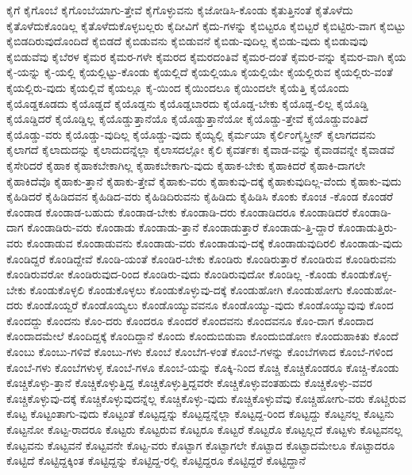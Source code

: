 {ಕೈಗೆ
ಕೈಗೊಂಬೆ
ಕೈಗೊಂಬೆಯಾಗು-ತ್ತೇವೆ
ಕೈಗೊಳ್ಳುವನು
ಕೈಜೋಡಿಸಿ-ಕೊಂಡು
ಕೈತುತ್ತಿನಂತೆ
ಕೈತೊಳೆದು
ಕೈತೊಳೆದುಕೊಂಡಿಲ್ಲ
ಕೈತೊಳೆದುಕೊಳ್ಳಬಲ್ಲರು
ಕೈದೀವಿಗೆ
ಕೈದು-ಗಳನ್ನು
ಕೈಬಿಟ್ಟರೂ
ಕೈಬಿಟ್ಟರೆ
ಕೈಬಿಟ್ಟಿರು-ವಾಗ
ಕೈಬಿಟ್ಟು
ಕೈಬಿಡದಿರುವುದೊಂದಿದೆ
ಕೈಬಿಡದೆ
ಕೈಬಿಡುವನು
ಕೈಬಿಡುವನೆ
ಕೈಬಿಡು-ವುದಿಲ್ಲ
ಕೈಬಿಡು-ವುದು
ಕೈಬಿಡುವುವು
ಕೈಬಿಡುವೆವು
ಕೈಬೆರಳ
ಕೈಮರ
ಕೈಮರ-ಗಳೇ
ಕೈಮರದ
ಕೈಮರದಂತಿವೆ
ಕೈಮರ-ದಂತೆ
ಕೈಮರ-ವನ್ನು
ಕೈಮರ-ವಾಗಿ
ಕೈಯ
ಕೈ-ಯನ್ನು
ಕೈ-ಯಲ್ಲಿ
ಕೈಯಲ್ಲಿಟ್ಟು-ಕೊಂಡು
ಕೈಯಲ್ಲಿದೆ
ಕೈಯಲ್ಲಿಯೂ
ಕೈಯಲ್ಲಿಯೇ
ಕೈಯಲ್ಲಿರುವ
ಕೈಯಲ್ಲಿರು-ವಂತೆ
ಕೈಯಲ್ಲಿರು-ವುದು
ಕೈಯಲ್ಲಿವೆ
ಕೈಯಲ್ಲೂ
ಕೈ-ಯಿಂದ
ಕೈಯಿಂದಲೂ
ಕೈಯಿಂದಲೇ
ಕೈಯೆತ್ತಿ
ಕೈಯೊಂದು
ಕೈಯೊಡ್ಡಕೂಡದು
ಕೈಯೊಡ್ಡದೆ
ಕೈಯೊಡ್ಡನು
ಕೈಯೊಡ್ಡಬಾರದು
ಕೈಯೊಡ್ಡ-ಬೇಕು
ಕೈಯೊಡ್ಡ-ಲಿಲ್ಲ
ಕೈಯೊಡ್ಡಿ
ಕೈಯೊಡ್ಡಿದರೆ
ಕೈಯೊಡ್ಡಿಲ್ಲ
ಕೈಯೊಡ್ಡುತ್ತಾನೆಯೊ
ಕೈಯೊಡ್ಡುತ್ತಾನೆಯೋ
ಕೈಯೊಡ್ಡು-ತ್ತೇವೆ
ಕೈಯೊಡ್ಡುವಂತಿದೆ
ಕೈಯೊಡ್ಡು-ವರು
ಕೈಯೊಡ್ಡು-ವುದಿಲ್ಲ
ಕೈಯೊಡ್ಡು-ವುದು
ಕೈಯ್ಯಲ್ಲಿ
ಕೈರ್ಮಯಾ
ಕೈರ್ಲಿಂಗೈಸ್ತ್ರೀನ್
ಕೈಲಾಗದವನು
ಕೈಲಾಗದೆ
ಕೈಲಾದುದನ್ನು
ಕೈಲಾದುದನ್ನೆಲ್ಲಾ
ಕೈಲಾಸದಲ್ಲೋ
ಕೈಲಿ
ಕೈವರ್ತಕಃ
ಕೈವಾಡ-ವನ್ನು
ಕೈವಾಡವನ್ನೇ
ಕೈವಾಡವೆ
ಕೈಸೇರಿದರೆ
ಕೈಹಾಕ
ಕೈಹಾಕಬೇಕಾಗಿಲ್ಲ
ಕೈಹಾಕಬೇಕಾಗು-ವುದು
ಕೈಹಾಕ-ಬೇಕು
ಕೈಹಾಕಿದರೆ
ಕೈಹಾಕಿ-ದಾಗಲೇ
ಕೈಹಾಕಿದೆವೊ
ಕೈಹಾಕು-ತ್ತಾನೆ
ಕೈಹಾಕು-ತ್ತೇವೆ
ಕೈಹಾಕು-ವರು
ಕೈಹಾಕುವು-ದಕ್ಕೆ
ಕೈಹಾಕುವುದಿಲ್ಲ-ವೆಂದು
ಕೈಹಾಕು-ವುದು
ಕೈಹಿಡಿದರೆ
ಕೈಹಿಡಿದವನ
ಕೈಹಿಡಿದ-ವರು
ಕೈಹಿಡಿದಿರುವನು
ಕೈಹಿಡಿದು
ಕೈಹಿಡಿಸಿ
ಕೊಂಕು
ಕೊಂಚ
-ಕೊಂಡ
ಕೊಂಡರೆ
ಕೊಂಡಾಡ
ಕೊಂಡಾಡ-ಬಹುದು
ಕೊಂಡಾಡ-ಬೇಕು
ಕೊಂಡಾಡಿ-ದರು
ಕೊಂಡಾಡಿದರೂ
ಕೊಂಡಾಡಿದರೆ
ಕೊಂಡಾಡಿ-ದಾಗ
ಕೊಂಡಾಡಿರು-ವರು
ಕೊಂಡಾಡು
ಕೊಂಡಾಡು-ತ್ತಾನೆ
ಕೊಂಡಾಡುತ್ತಾರೆ
ಕೊಂಡಾಡು-ತ್ತಿ-ದ್ದಾರೆ
ಕೊಂಡಾಡುತ್ತಿರು-ವರು
ಕೊಂಡಾಡುವ
ಕೊಂಡಾಡುವನು
ಕೊಂಡಾಡು-ವರು
ಕೊಂಡಾಡುವು-ದಕ್ಕೆ
ಕೊಂಡಾಡುವುದಿರಲಿ
ಕೊಂಡಾಡು-ವುದು
ಕೊಂಡಿದ್ದರೆ
ಕೊಂಡಿದ್ದೇವೆ
ಕೊಂಡಿ-ಯಂತೆ
ಕೊಂಡಿರ-ಬೇಕು
ಕೊಂಡಿರು
ಕೊಂಡಿರುತ್ತಾರೆ
ಕೊಂಡಿರುವ
ಕೊಂಡಿರುವನು
ಕೊಂಡಿರುವರೋ
ಕೊಂಡಿರುವುದ-ರಿಂದ
ಕೊಂಡಿರು-ವುದು
ಕೊಂಡಿರುವುದೋ
ಕೊಂಡಿಲ್ಲ
-ಕೊಂಡು
ಕೊಂಡುಕೊಳ್ಳ-ಬೇಕು
ಕೊಂಡುಕೊಳ್ಳಲಿ
ಕೊಂಡುಕೊಳ್ಳಲು
ಕೊಂಡುಕೊಳ್ಳುವು-ದಕ್ಕೆ
ಕೊಂಡುಹೋಗಿ
ಕೊಂಡುಹೋಗು
ಕೊಂಡುಹೋ-ದರು
ಕೊಂಡೊಯ್ದರೆ
ಕೊಂಡೊಯ್ಯಲು
ಕೊಂಡೊಯ್ಯುವವನೂ
ಕೊಂಡೊಯ್ಯು-ವುದು
ಕೊಂಡೊಯ್ಯುವುವು
ಕೊಂದ
ಕೊಂದದ್ದು
ಕೊಂದನು
ಕೊಂ-ದರು
ಕೊಂದರೂ
ಕೊಂದರೆ
ಕೊಂದವನು
ಕೊಂದವನೂ
ಕೊಂ-ದಾಗ
ಕೊಂದಾದ
ಕೊಂದಾದಮೇಲೆ
ಕೊಂದಿದ್ದಕ್ಕೆ
ಕೊಂದಿದ್ದಾನೆ
ಕೊಂದು
ಕೊಂದುಬಿಡುವಾ
ಕೊಂದುಬಿಡೋಣ
ಕೊಂದುಹಾಕಿತು
ಕೊಂದೆ
ಕೊಂಬು
ಕೊಂಬು-ಗಳಿವೆ
ಕೊಂಬು-ಗಳು
ಕೊಂಬೆ
ಕೊಂಬೆಗ-ಳಂತೆ
ಕೊಂಬೆ-ಗಳನ್ನು
ಕೊಂಬೆಗಳಾದ
ಕೊಂಬೆ-ಗಳಿಂದ
ಕೊಂಬೆ-ಗಳು
ಕೊಂಬೆಗಳುಳ್ಳ
ಕೊಂಬೆ-ಗಳೂ
ಕೊಂಬೆ-ಯನ್ನು
ಕೊಕ್ಕಿ-ನಿಂದ
ಕೊಚ್ಚಿ
ಕೊಚ್ಚಿಕೊಂಡರೂ
ಕೊಚ್ಚಿ-ಕೊಂಡು
ಕೊಚ್ಚಿಕೊಳ್ಳು-ತ್ತಾನೆ
ಕೊಚ್ಚಿಕೊಳ್ಳುತ್ತಿದ್ದ
ಕೊಚ್ಚಿಕೊಳ್ಳುತ್ತಿದ್ದವರೇ
ಕೊಚ್ಚಿಕೊಳ್ಳುವಂತಹುದು
ಕೊಚ್ಚಿಕೊಳ್ಳು-ವವರ
ಕೊಚ್ಚಿಕೊಳ್ಳುವು-ದಕ್ಕೆ
ಕೊಚ್ಚಿಕೊಳ್ಳುವುದನ್ನೆಲ್ಲ
ಕೊಚ್ಚಿಕೊಳ್ಳು-ವುದು
ಕೊಚ್ಚಿಕೊಳ್ಳುವೆವು
ಕೊಚ್ಚಿಹೋಗು-ವರು
ಕೊಟ್ಚಿರುವ
ಕೊಟ್ಟ
ಕೊಟ್ಟಂತಾಗು-ವುದು
ಕೊಟ್ಟಂತೆ
ಕೊಟ್ಟದ್ದನ್ನು
ಕೊಟ್ಟದ್ದನ್ನೆಲ್ಲಾ
ಕೊಟ್ಟದ್ದ-ರಿಂದ
ಕೊಟ್ಟದ್ದು
ಕೊಟ್ಟನಲ್ಲ
ಕೊಟ್ಟನು
ಕೊಟ್ಟನೋ
ಕೊಟ್ಟ-ರಾದರೂ
ಕೊಟ್ಟರು
ಕೊಟ್ಟರುವ
ಕೊಟ್ಟರೂ
ಕೊಟ್ಟರೆ
ಕೊಟ್ಟರೊ
ಕೊಟ್ಟಲ್ಲದೆ
ಕೊಟ್ಟಳು
ಕೊಟ್ಟವನಲ್ಲ
ಕೊಟ್ಟವನು
ಕೊಟ್ಟವನೆ
ಕೊಟ್ಟವನೇ
ಕೊಟ್ಟ-ವರು
ಕೊಟ್ಟಾಗ
ಕೊಟ್ಟಾಗಲೇ
ಕೊಟ್ಟಾದ
ಕೊಟ್ಟಾದಮೇಲೂ
ಕೊಟ್ಟಾದರೂ
ಕೊಟ್ಟಿದೆ
ಕೊಟ್ಟಿದ್ದಕ್ಕಿಂತ
ಕೊಟ್ಟಿದ್ದನ್ನು
ಕೊಟ್ಟಿದ್ದ-ರಲ್ಲಿ
ಕೊಟ್ಟಿದ್ದರೂ
ಕೊಟ್ಟಿದ್ದರೆ
ಕೊಟ್ಟಿದ್ದಾನೆ
}
